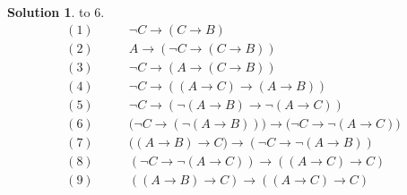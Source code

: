 \documentclass[12pt, a4paper]{ctexart} %
\theoremstyle{plain}
\theoremstyle{definition}
\newtheorem*{solution}{Solution}
\begin{document}
\begin{solution} to 6.
    \begin{align*}
        (1) \quad \quad & \neg C \to \left(C \to B\right) \tag{thm 6} \\
        (2) \quad \quad & A \to \left(\neg C \to \left(C \to B\right)\right)\tag{thm 1, rmp}\\
        (3) \quad \quad & \neg C \to \left(A \to \left(C \to B\right)\right) \tag{thm 3}\\
        (4) \quad \quad & \neg C \to \left(\left(A \to C\right) \to \left(A \to B\right)\right) \tag{A2, thm 8} \\
        (5) \quad \quad & \neg C \to \left(\neg \left(A \to B\right) \to \neg \left(A \to C\right)\right) \tag{thm 13, thm 8}\\
        (6) \quad \quad & \Big(\neg C \to \left(\neg \left(A \to B\right)\right)\Big)\to \Big(\neg C \to \neg \left(A \to C\right)\Big) \tag{A2, rmp}\\
        (7) \quad \quad & \Big( \left(A \to B\right) \to C \Big) \to \left(\neg C \to \neg \left(A \to B\right)\right) \tag{thm 13}\\
        (8) \quad \quad & \left(\neg C \to \neg \left(A \to C\right)\right) \to \left(\left(A \to C\right) \to C  \right) \tag{A3}\\
        (9) \quad \quad & \left( \left(A \to B \right) \to C\right) \to \left(\left(A \to C\right) \to C\right) \tag{thm 21, (7)(8)}
    \end{align*}
\end{solution}
\end{document}

